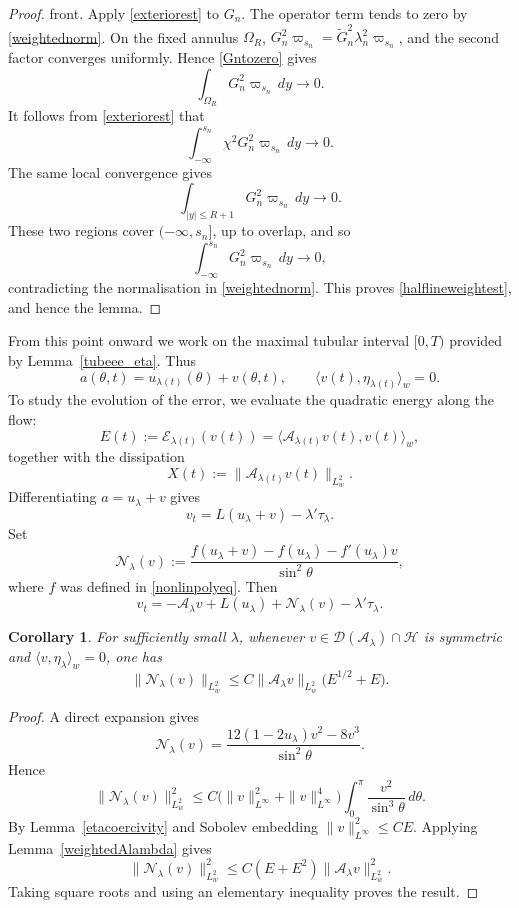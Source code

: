 \documentclass[11pt,a4paper]{article}
\numberwithin{equation}{section}
\theoremstyle{plain}
\newtheorem{corollary}[theorem]{Corollary}
\theoremstyle{remark}
\begin{document}
\begin{proof}
front. Apply \eqref{exteriorest} to $G_n$. The operator
term tends to zero by \eqref{weightednorm}. On the fixed
annulus $\Omega_R$, $G_n^2\varpi_{s_n}
=
\widetilde G_n^2\lambda_n^2\varpi_{s_n}$, and the second factor converges uniformly. Hence
\eqref{Gntozero} gives
$$
\int_{\Omega_R}G_n^2\varpi_{s_n}\,dy\longrightarrow0.
$$
It follows from \eqref{exteriorest} that
$$
\int_{-\infty}^{s_n}\chi^2G_n^2\varpi_{s_n}\,dy
\longrightarrow0.
$$
The same local convergence gives
$$
\int_{|y|\leq R+1}G_n^2\varpi_{s_n}\,dy
\longrightarrow0.
$$
These two regions cover $(-\infty,s_n]$, up to overlap, and so
$$
\int_{-\infty}^{s_n}G_n^2\varpi_{s_n}\,dy\longrightarrow0,
$$
contradicting the normalisation in
\eqref{weightednorm}. This proves
\eqref{halflineweightest}, and hence the lemma.
\end{proof}


From this point onward we work on the maximal tubular interval $[0,T)$ provided by Lemma~\ref{tubeee_eta}. Thus
$$
a(\theta,t)
=
u_{\lambda(t)}(\theta)+v(\theta,t),
\qquad
\langle v(t),\eta_{\lambda(t)}\rangle_w=0.
$$
To study the evolution of the error, we evaluate the quadratic energy along the flow:
$$
E(t)
:=
\mathcal E_{\lambda(t)}(v(t))
=
\langle\mathcal A_{\lambda(t)}v(t),v(t)\rangle_w,
$$
together with the dissipation
$$
X(t)
:=
\|\mathcal A_{\lambda(t)}v(t)\|_{L_w^2}.
$$
Differentiating $a=u_\lambda+v$ gives
$$
v_t
=
L(u_\lambda+v)-\lambda'\tau_\lambda.
$$
Set
$$
\mathcal N_\lambda(v)
:=
\frac{
f(u_\lambda+v)-f(u_\lambda)-f'(u_\lambda)v
}{\sin^2\theta},
$$
where $f$ was defined in \eqref{nonlinpolyeq}. Then
\begin{equation}\label{erroreqation}
v_t
=
-\mathcal A_\lambda v
+
L(u_\lambda)
+
\mathcal N_\lambda(v)
-
\lambda'\tau_\lambda.
\end{equation}

\begin{corollary}\label{OGquaderror}
For sufficiently small $\lambda$, whenever $v\in\mathcal D(\mathcal A_\lambda)\cap\mathcal H$ is symmetric and $\langle v,\eta_\lambda\rangle_w=0$, one has
$$
\|\mathcal N_\lambda(v)\|_{L_w^2}
\leq
C\|\mathcal A_\lambda v\|_{L_w^2}
\bigl(E^{1/2}+E\bigr).
$$
\end{corollary}
\begin{proof}
A direct expansion gives
$$
\mathcal N_\lambda(v)
=
\frac{12(1-2u_\lambda)v^2-8v^3}{\sin^2\theta}.
$$
Hence
$$
\|\mathcal N_\lambda(v)\|_{L_w^2}^2
\leq
C
\bigl(
\|v\|_{L^\infty}^2+\|v\|_{L^\infty}^4
\bigr)
\int_0^\pi\frac{v^2}{\sin^3\theta}\,d\theta.
$$
By Lemma~\ref{etacoercivity} and Sobolev embedding $\|v\|_{L^\infty}^2\leq CE$. Applying Lemma~\ref{weightedAlambda} gives
$$
\|\mathcal N_\lambda(v)\|_{L_w^2}^2
\leq
C(E+E^2)
\|\mathcal A_\lambda v\|_{L_w^2}^2.
$$
Taking square roots and using an elementary inequality proves the result.
\end{proof}
\end{document}
